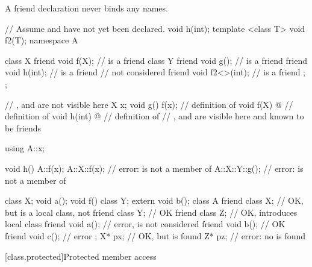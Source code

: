 \pnum
{}%
%
\begin{note}
A friend declaration never binds any names.
\end{note}
\begin{example}
\begin{codeblock}
// Assume  and  have not yet been declared.
void h(int);
template <class T> void f2(T);
namespace A {
  class X {
    friend void f(X);           //  is a friend
    class Y {
      friend void g();          //  is a friend
      friend void h(int);       //  is a friend
                                //  not considered
      friend void f2<>(int);    //  is a friend
    };
  };

  // ,  and  are not visible here
  X x;
  void g() { f(x); }            // definition of 
  void f(X) { @\commentellip@ }       // definition of 
  void h(int) { @\commentellip@ }     // definition of 
  // ,  and  are visible here and known to be friends
}

using A::x;

void h() {
  A::f(x);
  A::X::f(x);                   // error:  is not a member of 
  A::X::Y::g();                 // error:  is not a member of 
}
\end{codeblock}
\end{example}
\begin{example}
\begin{codeblock}
class X;
void a();
void f() {
  class Y;
  extern void b();
  class A {
  friend class X;   // OK, but  is a local class, not 
  friend class Y;   // OK
  friend class Z;   // OK, introduces local class 
  friend void a();  // error,  is not considered
  friend void b();  // OK
  friend void c();  // error
  };
  X* px;            // OK, but  is found
  Z* pz;            // error: no  is found
}
\end{codeblock}
\end{example}

[class.protected]{Protected member access}
%

